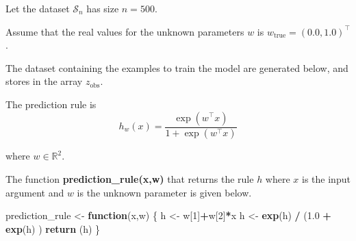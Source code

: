 \documentclass[
]{article}
\newenvironment{Shaded}{\begin{snugshade}}{\end{snugshade}}
\newcommand{\ControlFlowTok}[1]{\textcolor[rgb]{0.13,0.29,0.53}{\textbf{#1}}}
\newcommand{\DataTypeTok}[1]{\textcolor[rgb]{0.13,0.29,0.53}{#1}}
\newcommand{\DecValTok}[1]{\textcolor[rgb]{0.00,0.00,0.81}{#1}}
\newcommand{\FloatTok}[1]{\textcolor[rgb]{0.00,0.00,0.81}{#1}}
\newcommand{\KeywordTok}[1]{\textcolor[rgb]{0.13,0.29,0.53}{\textbf{#1}}}
\newcommand{\NormalTok}[1]{#1}
\newcommand{\OperatorTok}[1]{\textcolor[rgb]{0.81,0.36,0.00}{\textbf{#1}}}
\newcommand{\StringTok}[1]{\textcolor[rgb]{0.31,0.60,0.02}{#1}}
\begin{document}
Let the dataset \(\mathcal{S}_{n}\) has size \(n=500\).

Assume that the real values for the unknown parameters \(w\) is
\(w_{\text{true}}=(0.0,1.0)^\top\).

The dataset containing the examples to train the model are generated
below, and stores in the array \(z_{\text{obs}}\).

\begin{Shaded}
\end{Shaded}

The prediction rule is \[
h_{w}(x) = \frac {\exp(w^\top x)}{1+\exp(w^\top x)}
\]

where \(w\in\mathbb{R}^{2}\).

The function \textbf{prediction\_rule(x,w)} that returns the rule \(h\)
where \(x\) is the input argument and \(w\) is the unknown parameter is
given below.

\begin{Shaded}
\begin{Highlighting}[]
\NormalTok{prediction\_rule \textless{}{-}}\StringTok{ }\ControlFlowTok{function}\NormalTok{(x,w) \{}
\NormalTok{  h \textless{}{-}}\StringTok{ }\NormalTok{w[}\DecValTok{1}\NormalTok{]}\OperatorTok{+}\NormalTok{w[}\DecValTok{2}\NormalTok{]}\OperatorTok{*}\NormalTok{x}
\NormalTok{  h \textless{}{-}}\StringTok{ }\KeywordTok{exp}\NormalTok{(h) }\OperatorTok{/}\StringTok{ }\NormalTok{(}\FloatTok{1.0} \OperatorTok{+}\StringTok{ }\KeywordTok{exp}\NormalTok{(h) )}
  \KeywordTok{return}\NormalTok{ (h)}
\NormalTok{\}}
\end{Highlighting}
\end{Shaded}
\end{document}
